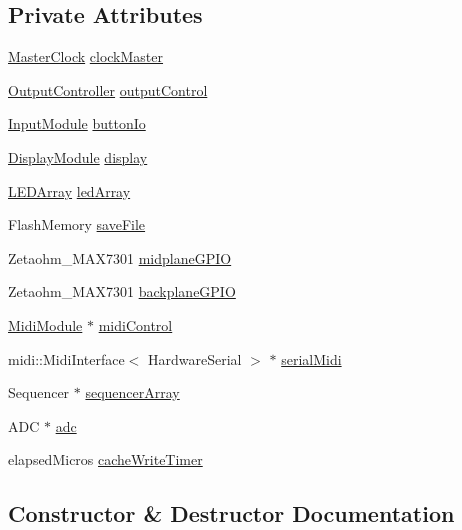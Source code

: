 \subsection*{Private Attributes}
\begin{DoxyCompactItemize}
\item 
\hyperlink{class_master_clock}{Master\+Clock} \hyperlink{class_time_controller_a4bcd78ceb9cc4d1d1ecd15998aab84e3}{clock\+Master}
\item 
\hyperlink{class_output_controller}{Output\+Controller} \hyperlink{class_time_controller_ac717861ff746e969f35876842defaa85}{output\+Control}
\item 
\hyperlink{class_input_module}{Input\+Module} \hyperlink{class_time_controller_a26e73c837f0bc2b17751899674b53bf4}{button\+Io}
\item 
\hyperlink{class_display_module}{Display\+Module} \hyperlink{class_time_controller_afd3a65fca30ffddc7a109e207839b9ec}{display}
\item 
\hyperlink{class_l_e_d_array}{L\+E\+D\+Array} \hyperlink{class_time_controller_afebd23c56781eb22ddd1a82437726a56}{led\+Array}
\item 
Flash\+Memory \hyperlink{class_time_controller_a70cef24b984cab7fb2ecb93e2ac52a33}{save\+File}
\item 
Zetaohm\+\_\+\+M\+A\+X7301 \hyperlink{class_time_controller_ad66fe36ae69d7a8881d4a9aa5b3f34af}{midplane\+G\+P\+IO}
\item 
Zetaohm\+\_\+\+M\+A\+X7301 \hyperlink{class_time_controller_a3df18dcb913419302f4bbc92412bbeb9}{backplane\+G\+P\+IO}
\item 
\hyperlink{class_midi_module}{Midi\+Module} $\ast$ \hyperlink{class_time_controller_ae937d8993e143f8c340d572b21db7541}{midi\+Control}
\item 
midi\+::\+Midi\+Interface$<$ Hardware\+Serial $>$ $\ast$ \hyperlink{class_time_controller_acb753f57965d145cdb399b83062513a5}{serial\+Midi}
\item 
Sequencer $\ast$ \hyperlink{class_time_controller_a90cd4f79debfe1959295b79842bd5e7c}{sequencer\+Array}
\item 
A\+DC $\ast$ \hyperlink{class_time_controller_a1b19c7d0b6f30005ef064f75d6e88cfd}{adc}
\item 
elapsed\+Micros \hyperlink{class_time_controller_a3a032a3b03a56144fff907ae41d9797b}{cache\+Write\+Timer}
\end{DoxyCompactItemize}


\subsection{Constructor \& Destructor Documentation}
\mbox{\label{class_time_controller_a556cfa71086ae3fb76cf79d9da0056e4}} 
